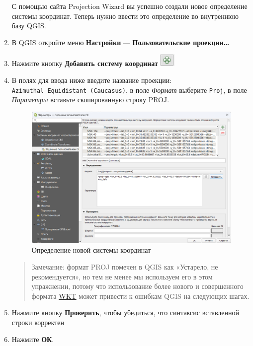 \documentclass[
  12pt,
]{book}
\begin{document}
\begin{enumerate}
  С помощью сайта Projection Wizard вы успешно создали новое определение системы координат. Теперь нужно ввести это определение во внутреннюю базу QGIS.
\item
  В QGIS откройте меню \textbf{Настройки} --- \textbf{Пользовательские проекции\ldots{}}
\item
  Нажмите кнопку \textbf{Добавить систему координат} \includegraphics{images/Ex01_MapGeneral/plus.png}
\item
  В полях для ввода ниже введите название проекции: \texttt{Azimuthal\ Equidistant\ (Caucasus)}, в поле \emph{Формат} выберите \texttt{Proj}, в поле \emph{Параметры} вставьте скопированную строку PROJ.

  \begin{figure}
  \centering
  \includegraphics{images/Ex01_MapGeneral/NewCRS.png}
  \caption{Определение новой системы координат}
  \end{figure}

  \begin{quote}
  Замечание: формат PROJ помечен в QGIS как «Устарело, не рекомендуется», но тем не менее мы используем его в этом упражнении, потому что использование более нового и совершенного формата \href{https://docs.geotools.org/stable/javadocs/org/opengis/referencing/doc-files/WKT.html}{WKT} может привести к ошибкам QGIS на следующих шагах.
  \end{quote}
\item
  Нажмите кнопку \textbf{Проверить}, чтобы убедиться, что синтаксис вставленной строки корректен
\item
  Нажмите \textbf{ОК}.


\end{enumerate}
\end{document}
